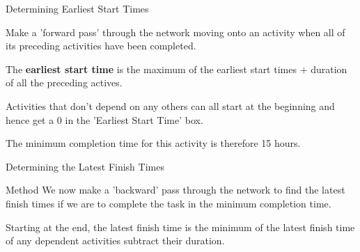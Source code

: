 \documentclass[8pt]{beamer}
\def\height{0.8cm}
\def\width{1.2cm}
\newcommand{\keynode}[6]{\node[minimum height=\height,minimum width=\width,draw,rectangle,color=aa,fill=cc] (#3) at (#1,#2) {};
	\node[rectangle,minimum height=\height/2,minimum width=\width,above,color=aa,fill=cc] at (#3) {#3};
	\node[draw,rectangle,minimum height=\height/2,minimum width=\width/3,below,color=aa,fill=cc,inner sep =0cm] at (#3) {\footnotesize#4};
	\node[draw,rectangle,minimum height=\height/2,minimum width=\width/3,below,xshift=\height/2,color=aa,fill=cc,inner sep=0cm] at (#3) {\footnotesize#5};
	\node[draw,rectangle,minimum height=\height/2,minimum width=\width/3,below,xshift=-\height/2,color=aa,fill=cc,inner sep=0cm] at (#3) {\footnotesize#6}; }
\begin{document}
\begin{frame}{Determining Earliest Start Times}
	\begin{definition}
		Make a 'forward pass' through the network moving onto an activity when all of its preceding activities have been completed.

		The \textbf{earliest start time} is the  maximum of the earliest start times $+$ duration of all the preceding actives.
	\end{definition}


\begin{center}
\end{center}

Activities that don't depend on any others can all start at the beginning and hence get a 0 in the 'Earliest Start Time' box.

The minimum completion time for this activity is therefore 15 hours.

\end{frame}

\begin{frame}{Determining the Latest Finish Times}
	\begin{block}{Method}
		We now make a 'backward' pass through the network to find the latest finish times if we are to complete the task in the minimum completion time.

		Starting at the end, the latest finish time is the minimum of the latest finish time of any dependent activities subtract their duration. 
	\end{block}




\begin{center}
\end{center}


\end{frame}
\end{document}
